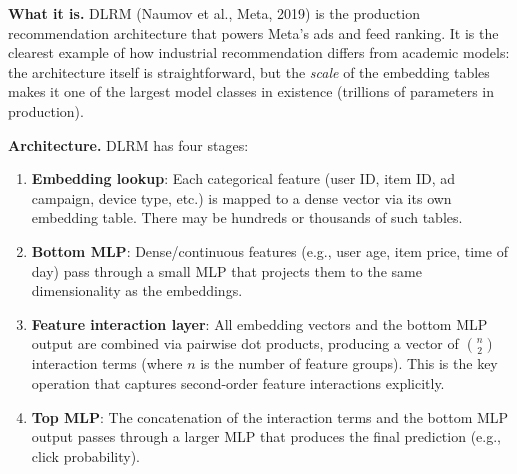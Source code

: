 \textbf{What it is.} DLRM (Naumov et al., Meta, 2019) is the production recommendation architecture that powers Meta's ads and feed ranking. It is the clearest example of how industrial recommendation differs from academic models: the architecture itself is straightforward, but the \textit{scale} of the embedding tables makes it one of the largest model classes in existence (trillions of parameters in production).

\textbf{Architecture.} DLRM has four stages:
\begin{enumerate}
    \item \textbf{Embedding lookup}: Each categorical feature (user ID, item ID, ad campaign, device type, etc.) is mapped to a dense vector via its own embedding table. There may be hundreds or thousands of such tables.
    \item \textbf{Bottom MLP}: Dense/continuous features (e.g., user age, item price, time of day) pass through a small MLP that projects them to the same dimensionality as the embeddings.
    \item \textbf{Feature interaction layer}: All embedding vectors and the bottom MLP output are combined via pairwise dot products, producing a vector of $\binom{n}{2}$ interaction terms (where $n$ is the number of feature groups). This is the key operation that captures second-order feature interactions explicitly.
    \item \textbf{Top MLP}: The concatenation of the interaction terms and the bottom MLP output passes through a larger MLP that produces the final prediction (e.g., click probability).
\end{enumerate}

